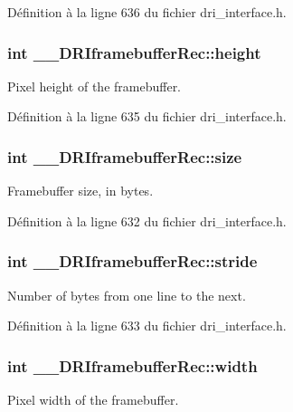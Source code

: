 Définition à la ligne 636 du fichier dri\-\_\-interface.\-h.

\hypertarget{struct_____d_r_iframebuffer_rec_aae5cb6f3fb0d56e7a8989bcb2a2d3761}{
\subsubsection[{height}]{\setlength{\rightskip}{0pt plus 5cm}int \-\_\-\-\_\-\-D\-R\-Iframebuffer\-Rec\-::height}}\label{struct_____d_r_iframebuffer_rec_aae5cb6f3fb0d56e7a8989bcb2a2d3761}
Pixel height of the framebuffer. 

Définition à la ligne 635 du fichier dri\-\_\-interface.\-h.

\hypertarget{struct_____d_r_iframebuffer_rec_aa3a4d320b15693103d593499abce5b08}{
\subsubsection[{size}]{\setlength{\rightskip}{0pt plus 5cm}int \-\_\-\-\_\-\-D\-R\-Iframebuffer\-Rec\-::size}}\label{struct_____d_r_iframebuffer_rec_aa3a4d320b15693103d593499abce5b08}
Framebuffer size, in bytes. 

Définition à la ligne 632 du fichier dri\-\_\-interface.\-h.

\hypertarget{struct_____d_r_iframebuffer_rec_a2889cbb92d1327c5bebb4cacbe9f6774}{
\subsubsection[{stride}]{\setlength{\rightskip}{0pt plus 5cm}int \-\_\-\-\_\-\-D\-R\-Iframebuffer\-Rec\-::stride}}\label{struct_____d_r_iframebuffer_rec_a2889cbb92d1327c5bebb4cacbe9f6774}
Number of bytes from one line to the next. 

Définition à la ligne 633 du fichier dri\-\_\-interface.\-h.

\hypertarget{struct_____d_r_iframebuffer_rec_a9b92fd71279bc61c4d58d88a8b06425b}{
\subsubsection[{width}]{\setlength{\rightskip}{0pt plus 5cm}int \-\_\-\-\_\-\-D\-R\-Iframebuffer\-Rec\-::width}}\label{struct_____d_r_iframebuffer_rec_a9b92fd71279bc61c4d58d88a8b06425b}
Pixel width of the framebuffer. 

